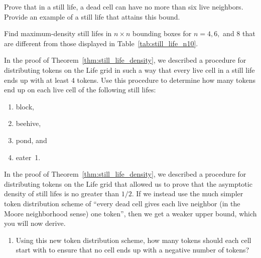 \begin{multicols}{2}
	
	\begin{problemstar}\label{exer:still_lifes_6_neigh} 
		Prove that in a still life, a dead cell can have no more than six live neighbors. Provide an example of a still life that attains this bound.
	\end{problemstar}
	
	
	\mfilbreak
	
	
	\begin{problem}\label{exer:densest_still_lifes} 
		Find maximum-density still lifes in $n \times n$ bounding boxes for $n = 4, 6,$ and $8$ that are different from those displayed in Table~\ref{tab:still_life_n10}.
	\end{problem}
	
	
	\mfilbreak
	
	
	\begin{problem}\label{exer:still_life_tokens} 
		In the proof of Theorem~\ref{thm:still_life_density}, we described a procedure for distributing tokens on the Life grid in such a way that every live cell in a still life ends up with at least $4$ tokens. Use this procedure to determine how many tokens end up on each live cell of the following still lifes:\smallskip
		
		\begin{enumerate}[label=\bf\color{ocre}(\alph*)]
			\item block,
			
			\item beehive,
			
			\item pond, and
			
			\item eater~1.
		\end{enumerate}
	\end{problem}
	
	
	\mfilbreak
	
	
	\begin{problemstar}\label{exer:sl_density_611} 
		In the proof of Theorem~\ref{thm:still_life_density}, we described a procedure for distributing tokens on the Life grid that allowed us to prove that the asymptotic density of still lifes is no greater than $1/2$. If we instead use the much simpler token distribution scheme of ``every dead cell gives each live neighbor (in the Moore neighborhood sense) one token'', then we get a weaker upper bound, which you will now derive.\smallskip
		
		\begin{enumerate}[label=\bf\color{ocre}(\alph*)]
			\item Using this new token distribution scheme, how many tokens should each cell start with to ensure that no cell ends up with a negative number of tokens?
			

\end{enumerate}
\end{problemstar}
\end{multicols}
